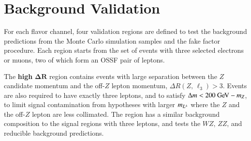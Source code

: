\begin{table}[htbp]
  \centering
  \caption{The impact of different sources of systematic uncertainty on the signal prediction for the type~III seesaw model with $m_{\lpm}=500 \GeV$, in terms of percent of the total signal normalization.}
  \label{table:systematics-impact-summary-seesaw-500}
\end{table}

\clearpage

\section{Background Validation}\label{sec:resonance-background-validation}
For each flavor channel, four validation regions are defined to test the background predictions from the Monte Carlo simulation samples and the fake factor procedure. Each region starts from the set of events with three selected electrons or muons, two of which form an OSSF pair of leptons. 

The \textbf{high} $\mathbf{\Delta R}$ region contains events with large separation between the $Z$ candidate momentum and the off-$Z$ lepton momentum, $\Delta R(Z,\,\ell_3)>3$. Events are also required to have exactly three leptons, and to satisfy $\deltam<200 \GeV - m_Z$, to limit signal contamination from hypotheses with larger $m_{L^{\pm}}$ where the $Z$ and the off-$Z$ lepton are less collimated. The region has a similar background composition to the signal regions with three leptons, and tests the $WZ$, $ZZ$, and reducible background predictions.

